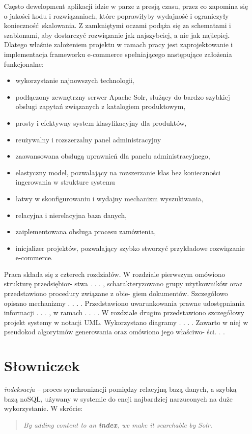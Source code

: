 Często dewelopment aplikacji idzie w parze z presją czasu, przez co zapomina  się o jakości kodu i rozwiązaniach, które poprawiłyby wydajność i ograniczyły konieczność skalowania. Z zamkniętymi oczami podąża się za schematami i szablonami, aby dostarczyć rozwiązanie jak najszybciej, a nie jak najlepiej. Dlatego właśnie założeniem projektu w ramach pracy jest zaprojektowanie i implementacja frameworku e-commerce spełniającego następujące założenia funkcjonalne:
\begin{itemize}
  	\item wykorzystanie najnowszych technologii,
	\item podłączony zewnętrzny serwer Apache Solr, służący do bardzo szybkiej obsługi zapytań związanych z katalogiem produktowym,
	\item prosty i efektywny system klasyfikacyjny dla produktów,
	\item reużywalny i rozszerzalny panel administracyjny 
	\item zaawansowana obsługą uprawnień dla panelu administracyjnego,
	\item elastyczny model, pozwalający na rozszerzanie klas bez konieczności ingerowania w strukture systemu
	\item łatwy w skonfigurowaniu i wydajny mechanizm wyszukiwania,
	\item relacyjna i nierelacyjna baza danych,
	\item zaiplementowana obsługa procesu zamówienia,
	\item inicjalizer projektów, pozwalający szybko stworzyć przykładowe rozwiązanie e-commerce.
\end{itemize}

Praca składa się z czterech rozdziałów. W rozdziale pierwszym omówiono strukturę przedsiębior-
stwa . . . , scharakteryzowano grupy użytkowników oraz przedstawiono procedury związane z obie-
giem dokumentów. Szczegółowo opisano mechanizmy . . . . Przedstawiono uwarunkowania prawne
udostępniania informacji . . . , w ramach . . . .
W rozdziale drugim przedstawiono szczegółowy projekt systemy w notacji UML. Wykorzystano
diagramy . . . . Zawarto w niej w pseudokod algorytmów generowania oraz omówiono jego właściwo-
ści. . . 

\section{Słowniczek}
\noindent
\textit{indeksacja} -- proces synchronizacji pomiędzy relacyjną bazą danych, a szybką bazą noSQL, używany w systemie do encji najbardziej narzuconych na duże wykorzystanie. W skrócie: 
\begin{quote}
	\textit{By adding content to an \textbf{index}, we make it searchable by Solr.}\cite{Solr} 
\end{quote}


